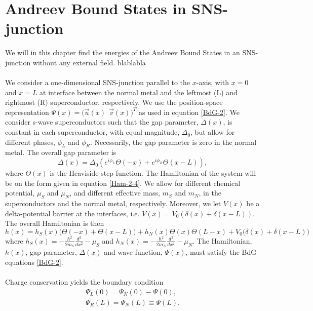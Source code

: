 \chapter{Andreev Bound States in SNS-junction}
We will in this chapter find the energies of the Andreev Bound States in an SNS-junction without any external field. blablabla
\\
\\
We consider a one-dimensional SNS-junction parallel to the $x$-axis, with $x=0$ and $x=L$ at interface between the normal metal and the leftmost (L) and rightmost (R) superconductor, respectively. We use the position-space representation $\Psi(x) = \big(\vec{u}(x) \ \ \vec{v}(x) \big)^T$ as used in equation \eqref{BdG-2}. We consider s-wave superconductors such that the gap parameter, $\Delta(x)$, is constant in each superconductor, with equal magnitude, $\Delta_0$, but allow for different phases, $\phi_L$ and $\phi_R$. Necessarily, the gap parameter is zero in the normal metal. The overall gap parameter is
\begin{equation}
    \Delta(x) = \Delta_0\left( e^{i\phi_L}\Theta(-x) + e^{i\phi_R}\Theta(x-L)\right),
\end{equation}
where $\Theta(x)$ is the Heaviside step function. 
The Hamiltonian of the system will be on the form given in equation \eqref{Ham-2-4}. We allow for different chemical potential, $\mu_S$ and $\mu_N$, and different effective mass, $m_S$ and $m_N$, in the superconductors and the normal metal, respectively. Moreover, we let $V(x)$ be a delta-potential barrier at the interfaces, i.e. $V(x) = V_0 \left( \delta(x) + \delta(x-L) \right)$. The overall Hamiltonian is then
\begin{equation}
    h(x) = h_S(x)\big(\Theta(-x) + \Theta(x-L) \big) + h_N(x)\Theta(x)\Theta(L-x) + V_0\big( \delta(x) + \delta(x-L) \big)
\end{equation}
where $h_S(x) = -\frac{\hbar^2}{2m_S}\frac{d^2}{dx^2}-\mu_S$ and $h_N(x) = -\frac{\hbar^2}{2m_N}\frac{d^2}{dx^2}-\mu_N$. The Hamiltonian, $h(x)$, gap parameter, $\Delta(x)$ and wave function, $\Psi(x)$, must satisfy the BdG-equations \eqref{BdG-2}.
\\
\\
Charge conservation yields the boundary condition
\begin{equation}
\begin{split}
    \Psi_L(0) = \Psi_N(0) \equiv \Psi(0),\\
    \Psi_R(L) = \Psi_N(L) \equiv \Psi(L).
\end{split}
\end{equation}
